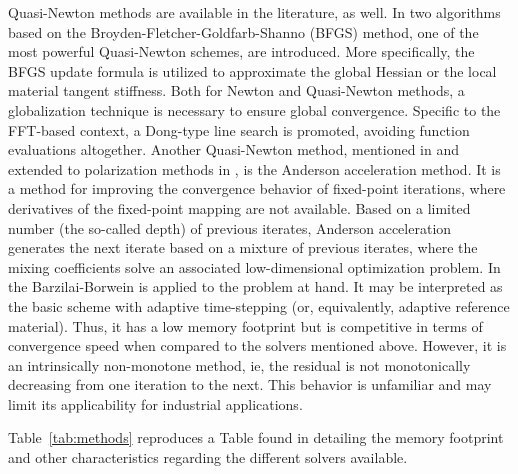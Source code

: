 Quasi-Newton methods are available in the literature, as well.
In \cite{wicht_quasinewton_2019} two algorithms based on the Broyden-Fletcher-Goldfarb-Shanno (BFGS) method, one of the most powerful Quasi-Newton schemes, are introduced.
More specifically, the BFGS update formula is utilized to approximate the global Hessian or the local material tangent stiffness.
Both for Newton and Quasi-Newton methods, a globalization technique is necessary to ensure global convergence.
Specific to the FFT-based context, a Dong-type line search is promoted, avoiding function evaluations altogether.
Another Quasi-Newton method, mentioned in \cite{wicht_quasinewton_2019} and extended to polarization methods in \cite{wicht_anderson-accelerated_2021}, is the Anderson acceleration method.
It is a method for improving the convergence behavior of fixed-point iterations, where derivatives of the fixed-point mapping are not available.
Based on a limited number (the so-called depth) of previous iterates, Anderson acceleration generates the next iterate based on a mixture of previous iterates, where the mixing coefficients
solve an associated low-dimensional optimization problem.
In \cite{schneider_barzilai-borwein_2019} the Barzilai-Borwein is applied to the problem at hand.
It may be interpreted as the basic scheme with adaptive time-stepping (or, equivalently, adaptive reference material).
Thus, it has a low memory footprint but is competitive in terms of convergence speed when compared to the solvers mentioned above.
However, it is an intrinsically non-monotone method, ie, the residual is not monotonically decreasing from one iteration to the next.
This behavior is unfamiliar and may limit its applicability for industrial applications.

Table~\ref{tab:methods} reproduces a Table found in \cite{wicht_quasinewton_2019} detailing the memory footprint and other characteristics regarding the different solvers available.



